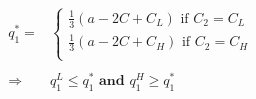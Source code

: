 \documentclass[
  course = {{IE579 Game Theory and Multi-Agent Reinforcement Learning}},
  quartile = {{4}},
  assignment = 2,
  name = {{Mohammad Mahdi Rahimi}},
  studentnumber = {{20208244}},
  email = {{mahi@kaist.ac.kr}},
  firstexercise = 1
]{aga-homework}
\begin{document}
\subexercise
\begin{equation}
    \begin{split}
    q^*_1 = & \begin{cases}
        \frac{1}{3}(a - 2C + C_L) \text{ if } C_2 = C_L\\
        \frac{1}{3}(a - 2C + C_H) \text{ if } C_2 = C_H\\
        \end{cases} \\\\
    \Rightarrow & q^L_1 \le q^*_1 \textbf{ and } q^H_1 \ge q^*_1 
    \end{split}
\end{equation}


\exercise


\exercise
\end{document}
